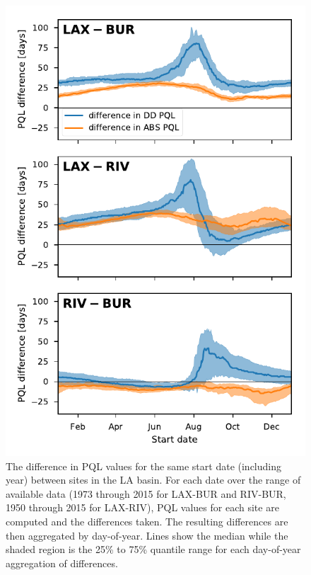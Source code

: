 \documentclass[10pt,a4paper]{article}
\begin{document}
\begin{figure}[hb!]
\centering
\includegraphics{figs/fig_between_site_differences_LA.pdf}
\caption{\label{fig:PQL_difference_between_sites_LA}
The difference in PQL values for the same start date (including year) between sites in the LA basin. 
For each date over the range of available data
(1973 through 2015 for LAX-BUR and RIV-BUR, 1950 through 2015 for LAX-RIV), PQL values 
for each site are computed and the differences taken.
The resulting differences are then aggregated by day-of-year.
Lines show the median while the shaded region is the 25\% to 75\% quantile
range for each day-of-year aggregation of differences.
}
\end{figure}
\clearpage
\end{document}
